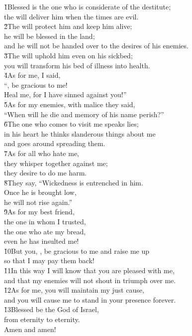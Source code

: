 \begin{poetry}
\poeml \v{1}Blessed is the one who is considerate of the destitute; \\
\poemll    the  will deliver him when the times are evil. \\
\poeml \v{2}The  will protect him and keep him alive; \\
\poemll    he will be blessed in the land; \\
\poemlll       and he will not be handed over to the desires of his enemies. \\
\poeml \v{3}The  will uphold him even on his sickbed; \\
\poemll    you will transform his bed of illness into health. \\
\poeml \v{4}As for me, I said, \\
\poemll    ``, be gracious to me! \\
\poemlll       Heal me, for I have sinned against you!'' \\
\poeml \v{5}As for my enemies, with malice they said, \\
\poemll    ``When will he die and memory of his name perish?'' \\
\poeml \v{6}The one who comes to visit me speaks lies; \\
\poemll    in his heart he thinks slanderous things about me \\
\poemlll       and goes around spreading them. \\
\poeml \v{7}As for all who hate me, \\
\poemll    they whisper together against me; \\
\poemlll       they desire to do me harm. \\
\poeml \v{8}They say, ``Wickedness is entrenched in him. \\
\poemll    Once he is brought low, \\
\poemlll       he will not rise again.'' \\
\poeml \v{9}As for my best friend, \\
\poemll    the one in whom I trusted, \\
\poeml the one who ate my bread, \\
\poemll    even he has insulted me! \\
\poeml \v{10}But you, , be gracious to me and raise me up \\
\poemll    so that I may pay them back! \\
\poeml \v{11}In this way I will know that you are pleased with me, \\
\poemll    and that my enemies will not shout in triumph over me. \\
\poeml \v{12}As for me, you will maintain my just cause, \\
\poemll    and you will cause me to stand in your presence forever. \\
\poeml \v{13}Blessed be the  God of Israel, \\
\poemll    from eternity to eternity. \\
\poemlll       Amen and amen!
\end{poetry}
